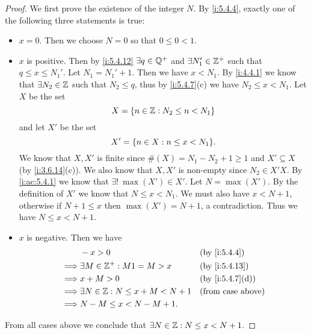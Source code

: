 \begin{proof}
  We first prove the existence of the integer \(N\).
  By \cref{i:5.4.4}, exactly one of the following three statements is true:
  \begin{itemize}
    \item \(x = 0\).
          Then we choose \(N = 0\) so that \(0 \leq 0 < 1\).
    \item \(x\) is positive.
          Then by \cref{i:5.4.12} \(\exists q \in \mathbb{Q}^+\) and \(\exists N_1' \in \mathbb{Z}^+\) such that \(q \leq x \leq N_1'\).
          Let \(N_1 = N_1' + 1\).
          Then we have \(x < N_1\).
          By \cref{i:4.4.1} we know that \(\exists N_2 \in \mathbb{Z}\) such that \(N_2 \leq q\), thus by \cref{i:5.4.7}(c) we have \(N_2 \leq x < N_1\).
          Let \(X\) be the set
          \[
            X = \left\lbrace n \in \mathbb{Z} : N_2 \leq n < N_1\right\rbrace
          \]
          and let \(X'\) be the set
          \[
            X' = \set{n \in X : n \leq x < N_1}.
          \]
          We know that \(X, X'\) is finite since \(\#(X) = N_1 - N_2 + 1 \geq 1\) and \(X' \subseteq X\) (by \cref{i:3.6.14}(c)).
          We also know that \(X, X'\) is non-empty since \(N_2 \in X'X\).
          By \cref{i:ac:5.4.1} we know that \(\exists!\ \max(X') \in X'\).
          Let \(N = \max(X')\).
          By the definition of \(X'\) we know that \(N \leq x < N_1\).
          We must also have \(x < N + 1\), otherwise if \(N + 1 \leq x\) then \(\max(X') = N + 1\), a contradiction.
          Thus we have \(N \leq x < N + 1\).
    \item \(x\) is negative.
          Then we have
          \begin{align*}
                     & -x > 0                                  &  & \by{i:5.4.4}             \\
            \implies & \exists M \in \Z^+ : M1 = M > x         &  & \by{i:5.4.13}            \\
            \implies & x + M > 0                               &  & \by{i:5.4.7}[d]          \\
            \implies & \exists N \in \Z : N \leq x + M < N + 1 &  & \text{(from case above)} \\
            \implies & N - M \leq x < N - M + 1.
          \end{align*}
  \end{itemize}
  From all cases above we conclude that \(\exists N \in \mathbb{Z} : N \leq x < N + 1\).


\end{proof}

